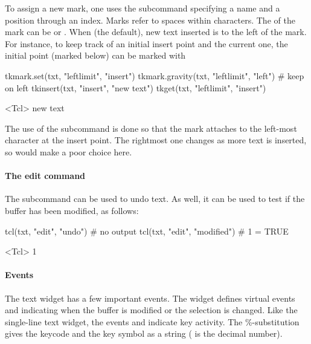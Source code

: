 To assign a new mark, one uses the 
subcommand specifying a name and a position through an index. Marks
refer to spaces within characters. The  of the mark can
be  or . When  (the default), new
text inserted is to the left of the mark. For instance, to keep track
of an initial insert point and the current one, the initial point
(marked  below) can be marked with
\begin{Schunk}
\begin{Sinput}
 tkmark.set(txt, "leftlimit", "insert")
 tkmark.gravity(txt, "leftlimit", "left")    # keep on left
 tkinsert(txt, "insert", "new text")
 tkget(txt, "leftlimit", "insert")
\end{Sinput}
\begin{Soutput}
<Tcl> new text 
\end{Soutput}
\end{Schunk}
%
The use of the subcommand  is done so
that the mark attaches to the left-most character at the insert
point. The rightmost one changes as more text is inserted, so would
make a poor choice here.


\paragraph{The edit command}
The subcommand  can be used to undo text. As
well, it can be used to test if the buffer has been modified, as
follows:
\begin{Schunk}
\begin{Sinput}
 tcl(txt, "edit", "undo")                  # no output
 tcl(txt, "edit", "modified")              # 1 = TRUE
\end{Sinput}
\begin{Soutput}
<Tcl> 1 
\end{Soutput}
\end{Schunk}



\paragraph{Events}
The text widget has a few important events.  The widget defines
virtual events  and
 indicating when the buffer is modified
or the selection is changed. Like the single-line text widget, the
events  and  indicate
key activity. The \%-substitution  gives the keycode and
 the key symbol as a string ( is the decimal number).



